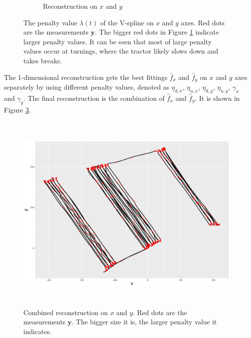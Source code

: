 \begin{figure}
\begin{subfigure}{\textwidth}
    \caption{Reconstruction on $x$ and $y$}\label{penaltyxyggXYPath}
    \end{subfigure}
 \caption{The penalty value $\lambda(t)$ of the V-spline on $x$ and $y$ axes. Red dots are the measurements $\mathbf{y}$. The bigger red dots in Figure \ref{penaltyxyggXYPath} indicate larger penalty values. It can be seen that most of large penalty values occur at turnings, where the tractor likely slows down and takes breaks. }\label{penaltyxygg}
 \end{figure}

The 1-dimensional reconstruction gets the best fittings $\hat{f}_x$ and $\hat{f}_y$ on $x$ and $y$ axes separately by using different penalty values, denoted as $\eta_{d,x}$, $\eta_{u,x}$, $\eta_{d,y}$, $\eta_{u,y}$, $\gamma_x$ and $\gamma_y$. The final reconstruction is the combination of  $\hat{f}_x$ and $\hat{f}_y$. It is shown in Figure \ref{1DCombinedXY}. 
\begin{figure}
  \centering
    \includegraphics[width=\textwidth,height=10cm]{Chapters/02TractorSplineTheory/plot/ggplot/ggRealdataCombinedXY2.pdf} 
  \caption{Combined reconstruction on $x$ and $y$. Red dots are the measurements $\mathbf{y}$. The bigger size it is, the larger penalty value it indicates. }\label{1DCombinedXY}
\end{figure}




